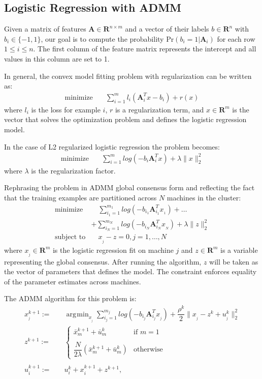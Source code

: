 \documentclass[10pt, conference, compsocconf]{IEEEtran}
\DeclareMathOperator*{\argmin}{arg\!\min}
\begin{document}
\subsection{Logistic Regression with ADMM}
Given a matrix of features $\mathbf{A}\in\mathbf{R}^{n\times m}$ and a vector of their labels $b\in\mathbf{R}^n$ with $b_i\in\{-1,1\}$, our goal is to compute the probability $\text{Pr}(b_i=1|\mathbf{A}_i)$ for each row $1\leq i\leq n$.  The first column of the feature matrix represents the intercept and all values in this column are set to 1.

In general, the convex model fitting problem with regularization can be written as:
\begin{align*}
\text{minimize}&\quad \sum_{i=1}^m l_i(\mathbf{A}_i^Tx - b_i) + r(x)
\end{align*}
where $l_i$ is the loss for example $i$, $r$ is a regularization term, and $x\in\mathbf{R}^m$ is the vector that solves the optimization problem and defines the logistic regression model.

In the case of L2 regularized logistic regression the problem becomes:
\begin{align*}
\text{minimize}&\quad \sum_{i=1}^m log(-b_i\mathbf{A}_i^Tx) + \lambda\|x\|_2^2
\end{align*}
where $\lambda$ is the regularization factor.

Rephrasing the problem in ADMM global consensus form and reflecting the fact that the training examples are partitioned across $N$ machines in the cluster:
\begin{align*}
\text{minimize}&\quad \sum_{i_1=1}^{m_1} log(-b_{i_1}\mathbf{A}_{i_1}^Tx_{_1})+\ldots \\
&+\sum_{i_N=1}^{m_N} log(-b_{i_N}\mathbf{A}_{i_N}^Tx_{_N})+\lambda\|z\|_2^2\\
\text{subject to}&\quad x_{_j} - z = 0, j = 1, \ldots, N
\end{align*}
where $x_{_j}\in\mathbf{R}^m$ is the logistic regression fit on machine $j$ and $z\in\mathbf{R}^m$ is a variable representing the global consensus.  After running the algorithm, $z$ will be taken as the vector of parameters that defines the model. The constraint enforces equality of the parameter estimates across machines.

The ADMM algorithm for this problem is:
\begin{align}
\label{eq:x}
x_{_j}^{k+1} :=&\quad \argmin_{x_{_j}} \sum_{i_j=1}^{m_j} log(-b_{i_j}\mathbf{A}_{i_j}^Tx_{_j}) + \dfrac{\rho^k}{2}\|x_{_j} - z^k + u_{_j}^k\|_2^2\\
\label{eq:z}
z^{k+1} :=&\quad \begin{cases}
    \bar{x}_m^{k+1} + \bar{u}_m^k& \text{if $m=1$}\\
    \\
    \dfrac{N}{2\lambda}(\bar{x}_m^{k+1} + \bar{u}_m^k)& \text{otherwise}
  \end{cases}\\
\nonumber\\
\label{eq:u}
u_i^{k+1} :=&\quad u_i^k + x_i^{k+1} + z^{k+1},
\end{align}
\end{document}

